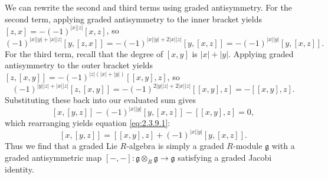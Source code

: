 \begin{discussion}
	We can rewrite the second and third terms using graded antisymmetry. For the second term, applying graded antisymmetry to the inner bracket yields $[z,x] = -(-1)^{\left| x \right| \left| z \right|}[x,z]$, so
    \[
        (-1)^{\left| x \right| \left| y \right| + \left| x \right| \left| z \right| } [y,[z,x]] = -(-1)^{\left| x \right| \left| y \right| + 2\left| x \right| \left| z \right| } [y,[x,z]] = -(-1)^{\left| x \right| \left| y \right|} [y,[x,z]]
    .\]
    For the third term, recall that the degree of $[x,y]$ is $\left| x \right| + \left| y \right|$. Applying graded antisymmetry to the outer bracket yields $[z,[x,y]] = -(-1)^{\left| z \right|(\left| x \right| + \left| y \right|)} [[x,y],z]$, so
    \[
        (-1)^{\left| y \right| \left| z \right| + \left| x \right| \left| z \right| } [z,[x,y]] = -(-1)^{2\left| y \right| \left| z \right| + 2\left| x \right| \left| z \right| } [[x,y],z] = -[[x,y],z]
    .\]
    Substituting these back into our evaluated sum gives
    \[
        [x,[y,z]] - (-1)^{\left| x \right| \left| y \right| } [y,[x,z]] - [[x,y],z] = 0
    ,\]
    which rearranging yields equation \eqref{eq:2.3.9.1}:
    \[
        [x,[y,z]]=[[x,y],z]+(-1)^{\left| x \right| \left| y \right| } [y,[x,z]]
    .\]
    Thus we find that a graded Lie $R$-algebra is simply a graded $R$-module $\mathfrak{g} $ with a graded antisymmetric map $[-,-]: \mathfrak{g} \otimes _R\mathfrak{g}  \to \mathfrak{g} $ satisfying a graded Jacobi identity.
\end{discussion}

